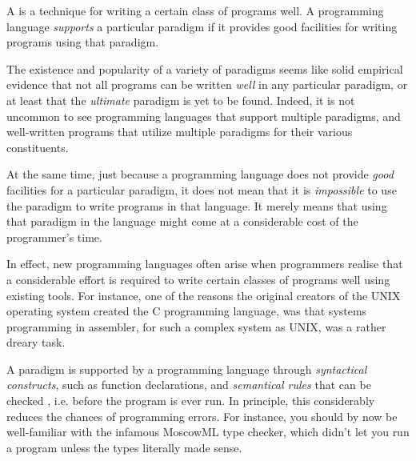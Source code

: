 A  is a technique for writing a certain class of
programs well. A programming language \emph{supports} a particular paradigm if
it provides good facilities for writing programs using that paradigm.

The existence and popularity of a variety of paradigms seems like solid
empirical evidence that not all programs can be written \emph{well} in any
particular paradigm, or at least that the \emph{ultimate} paradigm is yet to be
found.  Indeed, it is not uncommon to see programming languages that support
multiple paradigms, and well-written programs that utilize multiple paradigms
for their various constituents.

At the same time, just because a programming language does not provide
\emph{good} facilities for a particular paradigm, it does not mean that it is
\emph{impossible} to use the paradigm to write programs in that language. It
merely means that using that paradigm in the language might come at a
considerable cost of the programmer's time.

In effect, new programming languages often arise when programmers realise that
a considerable effort is required to write certain classes of programs well
using existing tools. For instance, one of the reasons the original creators of
the UNIX operating system created the C programming language, was that systems
programming in assembler, for such a complex system as UNIX, was a rather
dreary task\cite{the-development-of-c}.

A paradigm is supported by a programming language through \emph{syntactical
constructs}, such as function declarations, and \emph{semantical rules} that
can be checked , i.e.  before the program is ever run. In
principle, this considerably reduces the chances of programming errors. For
instance, you should by now be well-familiar with the infamous MoscowML type
checker, which didn't let you run a program unless the types literally made
sense.

